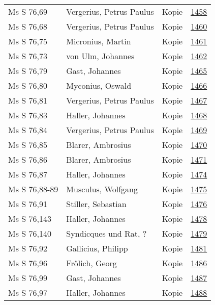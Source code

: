 \documentclass[10pt,a4paper,landscape]{report}
\begin{document}
\begin{longtable}{p{16cm}p{4cm}lr}
Ms S 76,69	&	Vergerius, Petrus Paulus	&	Kopie	&	\href{http://130.60.24.72/assignment/1458}{1458}\\
Ms S 76,68	&	Vergerius, Petrus Paulus	&	Kopie	&	\href{http://130.60.24.72/assignment/1460}{1460}\\
Ms S 76,75	&	Micronius, Martin	&	Kopie	&	\href{http://130.60.24.72/assignment/1461}{1461}\\
Ms S 76,73	&	von Ulm, Johannes	&	Kopie	&	\href{http://130.60.24.72/assignment/1462}{1462}\\
Ms S 76,79	&	Gast, Johannes	&	Kopie	&	\href{http://130.60.24.72/assignment/1465}{1465}\\
Ms S 76,80	&	Myconius, Oswald	&	Kopie	&	\href{http://130.60.24.72/assignment/1466}{1466}\\
Ms S 76,81	&	Vergerius, Petrus Paulus	&	Kopie	&	\href{http://130.60.24.72/assignment/1467}{1467}\\
Ms S 76,83	&	Haller, Johannes	&	Kopie	&	\href{http://130.60.24.72/assignment/1468}{1468}\\
Ms S 76,84	&	Vergerius, Petrus Paulus	&	Kopie	&	\href{http://130.60.24.72/assignment/1469}{1469}\\
Ms S 76,85	&	Blarer, Ambrosius	&	Kopie	&	\href{http://130.60.24.72/assignment/1470}{1470}\\
Ms S 76,86	&	Blarer, Ambrosius	&	Kopie	&	\href{http://130.60.24.72/assignment/1471}{1471}\\
Ms S 76,87	&	Haller, Johannes	&	Kopie	&	\href{http://130.60.24.72/assignment/1474}{1474}\\
Ms S 76,88-89	&	Musculus, Wolfgang	&	Kopie	&	\href{http://130.60.24.72/assignment/1475}{1475}\\
Ms S 76,91	&	Stiller, Sebastian	&	Kopie	&	\href{http://130.60.24.72/assignment/1476}{1476}\\
Ms S 76,143	&	Haller, Johannes	&	Kopie	&	\href{http://130.60.24.72/assignment/1478}{1478}\\
Ms S 76,140	&	Syndicques und Rat, ?	&	Kopie	&	\href{http://130.60.24.72/assignment/1479}{1479}\\
Ms S 76,92	&	Gallicius, Philipp	&	Kopie	&	\href{http://130.60.24.72/assignment/1481}{1481}\\
Ms S 76,96	&	Frölich, Georg	&	Kopie	&	\href{http://130.60.24.72/assignment/1486}{1486}\\
Ms S 76,99	&	Gast, Johannes	&	Kopie	&	\href{http://130.60.24.72/assignment/1487}{1487}\\
Ms S 76,97	&	Haller, Johannes	&	Kopie	&	\href{http://130.60.24.72/assignment/1488}{1488}\\

\end{longtable}
\end{document}
